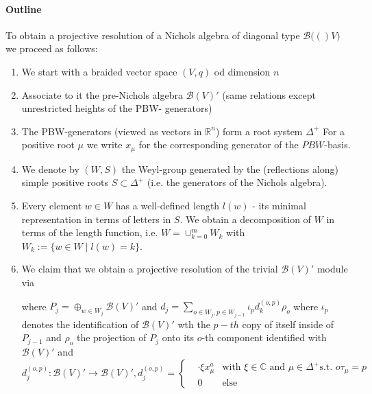 \documentclass{amsart}
\theoremstyle{definition}
\newcommand{\Nichols}[1]{\ensuremath{\mathcal{B}(#1)}}
\begin{document}
	\paragraph{Outline} To obtain a projective resolution of a Nichols algebra of diagonal type $\Nichols(V)$ we proceed as follows:
	\begin{enumerate}
		\item We start with a braided vector space $(V,q)$ od dimension $n$
		\item Associate to it the pre-Nichols algebra $\Nichols{V}'$ (same relations except unrestricted heights of the PBW- generators)
		\item The PBW-generators (viewed as vectors in $\mathbb R^n$) form a root system $\Delta^+$
		For a positive root $\mu$ we write $x_\mu$ for the corresponding generator of the $PBW$-basis.
		\item We denote by $(W,S)$ the Weyl-group generated by the (reflections along) simple positive roots $S \subset \Delta^+$ (i.e. the generators of the Nichols algebra).
		\item Every element $w\in W$ has a well-defined length $l(w)$ - its minimal representation in terms of letters in $S$. We obtain a decomposition of $W$ in terms of the length function, i.e. 
		$W = \cup_{k=0}^m W_k$ with $W_k:= \{ w \in W \mid l(w)=k\}$.
		\item We claim that we obtain a projective resolution of the trivial $\Nichols V'$ module via 
		\begin{center}
		\end{center}
		where  $P_j = \oplus_{w\in W_j }\Nichols V'$ and $d_j= \sum_{o \in W_j, p\in W_{j-1}} \iota_p d_k^{(o,p)}\rho_o$ where $\iota_p$ denotes the identification of $\Nichols V'$ wth the $p-th$ copy of itself inside of $P_{j-1}$ and $\rho_o$ the projection of $P_j$ onto its $o$-th component identified with $\Nichols V'$ and
		$$
			d_j^{(o,p)}: \Nichols V' \rightarrow \Nichols V', d_j^{(o,p)} = 
			\left\{ \begin{aligned}
				&\cdot \xi x_\mu^a  	& \text{with } \xi \in \mathbb C  \text{  and } \mu \in \Delta^+ \text{s.t. } o \tau_\mu =p \\
				&0 				&\text{else}
			\end{aligned} \right.
		$$
	\end{enumerate}
\end{document}
